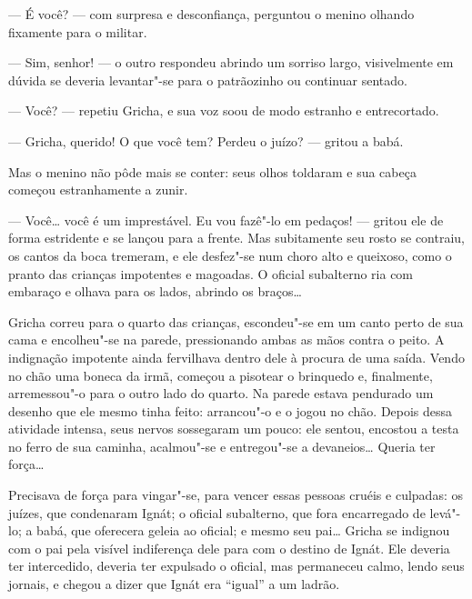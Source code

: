 --- É você? --- com surpresa e desconfiança, perguntou o menino olhando
fixamente para o militar.

--- Sim, senhor! --- o outro respondeu abrindo um sorriso largo,
visivelmente em dúvida se deveria levantar"-se para o patrãozinho ou
continuar sentado.

--- Você? --- repetiu Gricha, e sua voz soou de modo estranho e
entrecortado.

--- Gricha, querido! O que você tem? Perdeu o juízo? --- gritou a babá.

Mas o menino não pôde mais se conter: seus olhos toldaram e sua cabeça começou estranhamente a zunir.

--- Você\ldots{} você é um imprestável. Eu vou fazê"-lo em pedaços! --- gritou
ele de forma estridente e se lançou para a frente. Mas subitamente seu
rosto se contraiu, os cantos da boca tremeram, e ele desfez"-se num choro
alto e queixoso, como o pranto das crianças impotentes e magoadas. O oficial
subalterno ria com embaraço e olhava para os lados, abrindo os braços\ldots{}

Gricha correu para o quarto das crianças, escondeu"-se em um canto perto
de sua cama e encolheu"-se na parede, pressionando ambas as mãos contra o
peito. A indignação impotente ainda fervilhava dentro dele à procura de
uma saída. Vendo no chão uma boneca da irmã, começou a pisotear o
brinquedo e, finalmente, arremessou"-o para o outro lado do quarto. Na
parede estava pendurado um desenho que ele mesmo tinha feito: arrancou"-o
e o jogou no chão. Depois dessa atividade intensa, seus nervos
sossegaram um pouco: ele sentou, encostou a testa no ferro de sua
caminha, acalmou"-se e entregou"-se a devaneios\ldots{} Queria ter força\ldots{}

Precisava de força para vingar"-se, para vencer essas pessoas cruéis e
culpadas: os juízes, que condenaram Ignát; o oficial subalterno, que
fora encarregado de levá"-lo; a babá, que oferecera geleia ao oficial; e
mesmo seu pai\ldots{} Gricha se indignou com o pai pela visível indiferença
dele para com o destino de Ignát. Ele deveria ter intercedido, deveria
ter expulsado o oficial, mas permaneceu calmo, lendo seus jornais, e
chegou a dizer que Ignát era ``igual'' a um ladrão.



